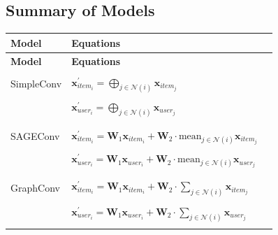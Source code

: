 \documentclass{scrartcl}
\begin{document}
\begin{appendices}

\clearpage

\section{Summary of Models}\label{secA1}

\begin{longtable}{|l|l|l|}
    \hline
    \textbf{Model} & \textbf{Equations} \\
    \hline
    \endfirsthead
    
    \hline
    \textbf{Model} & \textbf{Equations} \\
    \hline
    \endhead
    
    \endfoot
    
    \hline
    \rowcolor[gray]{0.9} & \\
    \rowcolor[gray]{0.9} SimpleConv & $\mathbf{x}^{\prime}_{item_{i}} = \bigoplus_{j \in \mathcal{N}(i)} \mathbf{x}_{item_{j}}$ \\
    \rowcolor[gray]{0.9} & \\
    \rowcolor[gray]{0.9} & $\mathbf{x}^{\prime}_{user_{i}} = \bigoplus_{j \in \mathcal{N}(i)} \mathbf{x}_{user_{j}}$ \\
    \rowcolor[gray]{0.9} & \\

     & \\
    SAGEConv & $\mathbf{x}^{\prime}_{item_{i}} = \mathbf{W}_1 \mathbf{x}_{item_{i}} + \mathbf{W}_2 \cdot \mathrm{mean}_{j \in \mathcal{N}(i)} \mathbf{x}_{item_{j}}$ \\
     & \\
    & $\mathbf{x}^{\prime}_{user_{i}} = \mathbf{W}_1 \mathbf{x}_{user_{i}} + \mathbf{W}_2 \cdot \mathrm{mean}_{j \in \mathcal{N}(i)} \mathbf{x}_{user_{j}}$ \\
     & \\
    
    \rowcolor[gray]{0.9} & \\
    \rowcolor[gray]{0.9} GraphConv & $\mathbf{x}^{\prime}_{item_{i}} = \mathbf{W}_1 \mathbf{x}_{item_{i}} + \mathbf{W}_2 \cdot \sum_{j \in \mathcal{N}(i)} \mathbf{x}_{item_{j}}$ \\
    \rowcolor[gray]{0.9} & \\
    \rowcolor[gray]{0.9} & $\mathbf{x}^{\prime}_{user_{i}} = \mathbf{W}_1 \mathbf{x}_{user_{i}} + \mathbf{W}_2 \cdot \sum_{j \in \mathcal{N}(i)} \mathbf{x}_{user_{j}}$ \\
    \rowcolor[gray]{0.9} & \\


\end{longtable}
\end{appendices}
\end{document}
